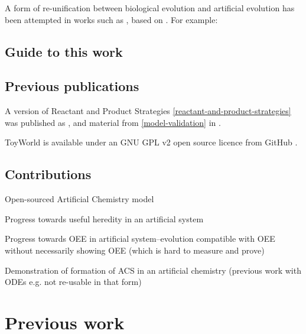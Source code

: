 A form of re-unification between biological evolution and artificial evolution has been attempted in works such as \parencite{Paixao2015}, based on . For example: 

\section{Guide to this work}

\section{Previous publications}\label{previous-publications}

A version of Reactant and Product Strategies \cref{reactant-and-product-strategies} was published as \cite{Young2015},
and material from \cref{model-validation} in \cite{Young2013}.

ToyWorld is available under an GNU GPL v2 open source licence from GitHub \cite{toyworld}.

\section{Contributions}\label{contributions}

\begin{compactenum}
\item Open-sourced Artificial Chemistry model
\item Progress towards useful heredity in an artificial system
\item Progress towards OEE in artificial system--evolution compatible with OEE without necessarily showing OEE (which is hard to measure and prove)
\item Demonstration of formation of ACS in an artificial chemistry (previous work with ODEs e.g. \parencite{Hurndall2014} not re-usable in that form)
\end{compactenum}

\chapter{Previous work}\label{previous-work}

